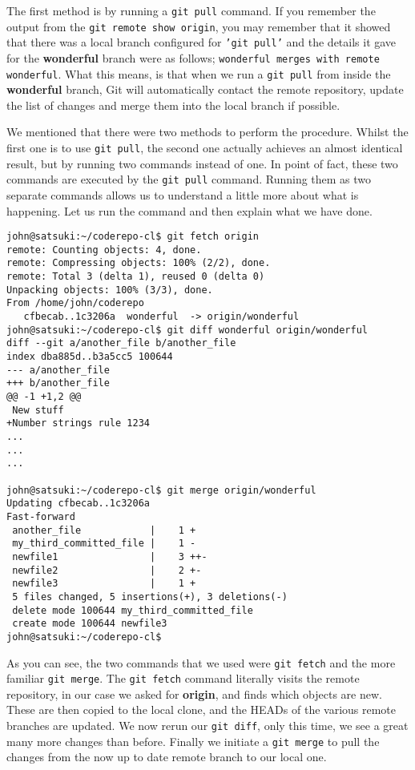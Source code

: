 The first method is by running a \texttt{git pull} command.  If you remember the output from the \texttt{git remote show origin}, you may remember that it showed that there was a local branch configured for \texttt{'git pull'} and the details it gave for the \textbf{wonderful} branch were as follows; \texttt{wonderful merges with remote wonderful}.  What this means, is that when we run a \texttt{git pull} from inside the \textbf{wonderful} branch, Git will automatically contact the remote repository, update the list of changes and merge them into the local branch if possible.

We mentioned that there were two methods to perform the procedure.  Whilst the first one is to use \texttt{git pull}, the second one actually achieves an almost identical result, but by running two commands instead of one.  In point of fact, these two commands are executed by the \texttt{git pull} command.  Running them as two separate commands allows us to understand a little more about what is happening.  Let us run the command and then explain what we have done.

\begin{Verbatim}
john@satsuki:~/coderepo-cl$ git fetch origin
remote: Counting objects: 4, done.
remote: Compressing objects: 100% (2/2), done.
remote: Total 3 (delta 1), reused 0 (delta 0)
Unpacking objects: 100% (3/3), done.
From /home/john/coderepo
   cfbecab..1c3206a  wonderful  -> origin/wonderful
john@satsuki:~/coderepo-cl$ git diff wonderful origin/wonderful 
diff --git a/another_file b/another_file
index dba885d..b3a5cc5 100644
--- a/another_file
+++ b/another_file
@@ -1 +1,2 @@
 New stuff
+Number strings rule 1234
...
...
...

john@satsuki:~/coderepo-cl$ git merge origin/wonderful 
Updating cfbecab..1c3206a
Fast-forward
 another_file            |    1 +
 my_third_committed_file |    1 -
 newfile1                |    3 ++-
 newfile2                |    2 +-
 newfile3                |    1 +
 5 files changed, 5 insertions(+), 3 deletions(-)
 delete mode 100644 my_third_committed_file
 create mode 100644 newfile3
john@satsuki:~/coderepo-cl$ 
\end{Verbatim}

As you can see, the two commands that we used were \texttt{git fetch} and the more familiar \texttt{git merge}.  The \texttt{git fetch} command literally visits the remote repository, in our case we asked for \textbf{origin}, and finds which objects are new.  These are then copied to the local clone, and the HEADs of the various remote branches are updated.  We now rerun our \texttt{git diff}, only this time, we see a great many more changes than before.  Finally we initiate a \texttt{git merge} to pull the changes from the now up to date remote branch to our local one.

